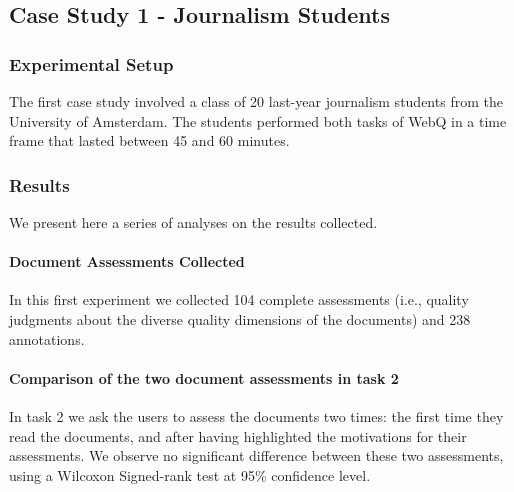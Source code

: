 \documentclass{llncs}
\begin{document}
\subsection{Case Study 1 - Journalism Students}
\subsubsection{Experimental Setup} The first case study involved a class of 20 last-year journalism students from the University of Amsterdam. The students performed both tasks of WebQ in a time frame that lasted between 45 and 60 minutes.
\subsubsection{Results} We present here a series of analyses on the results collected. 
\paragraph{Document Assessments Collected} In this first experiment we collected 104 complete assessments (i.e., quality judgments about the diverse quality dimensions of the documents) and 238 annotations.
\paragraph{Comparison of the two document assessments in task 2}
In task 2 we ask the users to assess the documents two times: the first time they read the documents, and after having highlighted the motivations for their assessments. We observe no significant difference between these two assessments, using a Wilcoxon Signed-rank test at 95\% confidence level.
\end{document}
